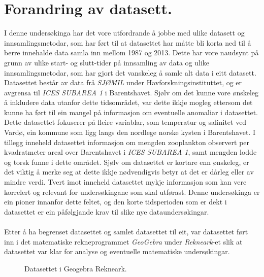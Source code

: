 \documentclass{report}
\begin{document}
\section{Forandring av datasett.}
I denne undersøkinga har det vore utfordrande å jobbe med ulike datasett og innsamlingsmetodar, som har ført til at datasettet har måtte bli korta ned til å berre innehalde data samla inn mellom 1987 og 2013. Dette har vore naudsynt på grunn av ulike start- og slutt-tider på innsamling av data og ulike innsamlingsmetodar, som har gjort det vanskeleg å samle alt data i eitt datasett. Datasettet består av data frå \textit{SJØMIL} under Havforskningsinstituttet, og er avgrensa til \textit{ICES SUBAREA 1} i Barentshavet. Sjølv om det kunne vore ønskeleg å inkludere data utanfor dette tidsområdet, var dette ikkje mogleg ettersom det kunne ha ført til ein mangel på informasjon om eventuelle anomaliar i datasettet.
Dette datasettet fokuserer på fleire variablar, som temperatur og salinitet ved Vardø, ein kommune som ligg langs den nordlege norske kysten i Barentshavet. I tillegg inneheld datasettet informasjon om mengden zooplankton observert per kvadratmeter areal over Barentshavet i \textit{ICES SUBAREA 1}, samt mengden lodde og torsk funne i dette området. 
Sjølv om datasettet er kortare enn ønskeleg, er det viktig å merke seg at dette ikkje nødvendigvis betyr at det er dårleg eller av mindre verdi. Tvert imot inneheld datasettet mykje informasjon som kan vere korrelert og relevant for undersøkingane som skal utførast. Denne undersøkinga er ein pioner innanfor dette feltet, og den korte tidsperioden som er dekt i datasettet er ein påfølgjande krav til slike nye dataundersøkingar. \\
\\ 
Etter å ha begrenset datasettet og samlet datasettet til eit, var datasettet ført inn i det matematiske rekneprogrammet \textit{GeoGebra} under \textit{Rekneark}-et slik at datasettet var klar for analyse og eventuelle matematiske undersøkingar.
\begin{figure}[H]
    \centering
    \caption{Datasettet i Geogebra Rekneark.}
    \label{F2}
\end{figure}\newpage
\end{document}
